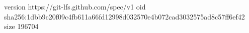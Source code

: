 version https://git-lfs.github.com/spec/v1
oid sha256:1dbb9c20f09c4fb611a66fd12998d032570e4b072cad3032575ad8c57ff6ef42
size 196704
